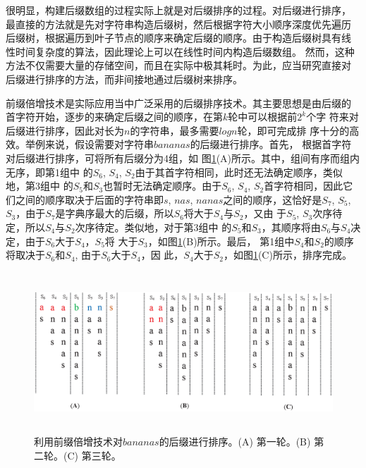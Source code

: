 很明显，构建后缀数组的过程实际上就是对后缀排序的过程。对后缀进行排序，
最直接的方法就是先对字符串构造后缀树，然后根据字符大小顺序深度优先遍历
后缀树，根据遍历到叶子节点的顺序来确定后缀的顺序。由于构造后缀树具有线
性时间复杂度的算法，因此理论上可以在线性时间内构造后缀数组。 然而，这种
方法不仅需要大量的存储空间，而且在实际中极其耗时。为此，应当研究直接对
后缀进行排序的方法，而非间接地通过后缀树来排序。

前缀倍增技术是实际应用当中广泛采用的后缀排序技术。其主要思想是由后缀的
首字符开始，逐步的来确定后缀之间的顺序，在第$k$轮中可以根据前$2^k$个字
符来对后缀进行排序，因此对长为$n$的字符串，最多需要$logn$轮，即可完成排
序十分的高效。举例来说，假设需要对字符串$bananas$的后缀进行排序。首先，
根据首字符对后缀进行排序，可将所有后缀分为4组，如
图\ref{fig:Prefix_Doubling}(A)所示。其中，组间有序而组内无序，即第1组中
的$S_6$, $S_4$,
$S_2$由于其首字符相同，此时还无法确定顺序，类似地，第3组中
的$S_5$和$S_3$也暂时无法确定顺序。由于$S_6$, $S_4$,
$S_2$首字符相同，因此它们之间的顺序取决于后面的字符串即$s$, $nas$,
$nanas$之间的顺序，这恰好是$S_7$, $S_5$,
$S_3$，由于$S_7$是字典序最大的后缀，所以$S_6$将大于$S_4$与$S_2$，又由
于$S_5$,
$S_3$次序待定，所以$S_4$与$S_2$次序待定。类似地，对于第3组中
的$S_5$和$S_3$，其顺序将由$S_6$与$S_4$决定，由于$S_6$大于$S_4$，$S_5$将
大于$S_3$，如图\ref{fig:Prefix_Doubling}(B)所示。最后，
第1组中$S_4$和$S_2$的顺序将取决于$S_6$和$S_4$, 由于$S_6$大于$S_4$，因
此，$S_4 $大于$S_2$，如图\ref{fig:Prefix_Doubling}(C)所示，排序完成。

\begin{figure}[!h]
  \centering
  \includegraphics[height=6cm ,width=15cm]{figures/1_Introduction/Prefix_Doubling.eps}
  \caption{利用前缀倍增技术对$bananas$的后缀进行排序。(A) 第一轮。(B) 第二轮。(C) 第三轮。}
  \label{fig:Prefix_Doubling}
\end{figure}
